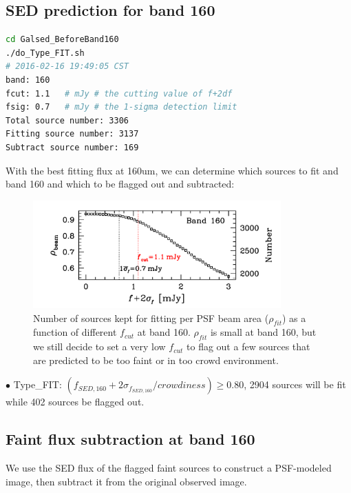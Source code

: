 \documentclass[11pt,a4paper]{article}
\begin{document}
\subsection{SED prediction for band 160}
\label{Band160_Galpre}

\begin{lstlisting}[language=bash]
cd Galsed_BeforeBand160
./do_Type_FIT.sh
# 2016-02-16 19:49:05 CST
band: 160
fcut: 1.1   # mJy # the cutting value of f+2df
fsig: 0.7   # mJy # the 1-sigma detection limit
Total source number: 3306
Fitting source number: 3137
Subtract source number: 169
\end{lstlisting}

With the best fitting flux at 160um, we can determine which sources to fit and band 160 and which to be flagged out and subtracted: 

\begin{figure}[H]
	\caption{Number of sources kept for fitting per PSF beam area ($\rho_{fit}$) as a function of different $f_{cut}$ at band 160. $\rho_{fit}$ is small at band 160, but we still decide to set a very low $f_{cut}$ to flag out a few sources that are predicted to be too faint or in too crowd environment.}
	\includegraphics[width=0.85\textwidth]{plot_cutting_flux_160}
\end{figure}

\indent\hspace{15pt}$\bullet$ 
Type\_FIT: $(f_{SED,160}+2\sigma_{f_{SED,160}}/crowdiness) \ge 0.80$, 2904 sources will be fit while 402 sources be flagged out. 
\\

\subsection{Faint flux subtraction at band 160}
\label{Band160_Galsub}

We use the SED flux of the flagged faint sources to construct a PSF-modeled image, then subtract it from the original observed image. 
\end{document}
